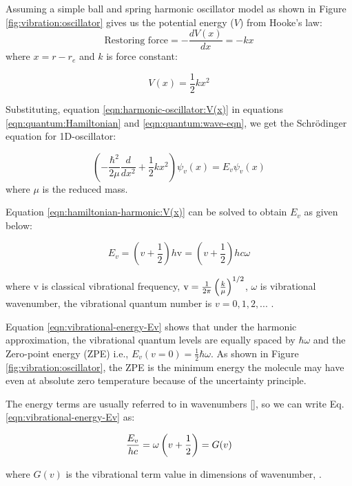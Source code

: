 Assuming a simple ball and spring harmonic oscillator model as shown in Figure \ref{fig:vibration:oscillator} gives us the potential energy ($V$) from Hooke's law:
\[\text{Restoring force} = - \frac{dV(x)}{dx} = -kx\]
where $x=r-r_e$ and $k$ is force constant:

\begin{equation}
    \label{eqn:harmonic-oscillator:V(x)}
    V(x) = \frac{1}{2} k x^2
\end{equation}

Substituting, equation \ref{eqn:harmonic-oscillator:V(x)} in equations \ref{eqn:quantum:Hamiltonian} and \ref{eqn:quantum:wave-eqn}, we get the Schr\"odinger equation for 1D-oscillator:

\begin{equation}
    \label{eqn:hamiltonian-harmonic:V(x)}
    \left( -\frac{\hbar^2}{2\mu} \frac{d}{d x^2} + \frac{1}{2} k x^2 \right ) \psi_v(x) = E_v\psi_v(x)
\end{equation}
where $\mu$ is the reduced mass.

Equation \ref{eqn:hamiltonian-harmonic:V(x)} can be solved to obtain $E_v$ as given below:

\begin{equation}
    \label{eqn:vibrational-energy-Ev}
    E_v = \left( v + \frac{1}{2} \right) h \text{v} = \left( v + \frac{1}{2} \right) hc\omega
\end{equation}

where v is classical vibrational frequency, $\text{v}=\frac{1}{2\pi}\left( \frac{k}{\mu} \right)^{1/2}$, $\omega$ is vibrational wavenumber, the vibrational quantum number is $v=0, 1, 2, ...$ .


Equation \ref{eqn:vibrational-energy-Ev} shows that under the harmonic approximation, the vibrational quantum levels are equally spaced by $\hbar\omega$ and the Zero-point energy (ZPE) i.e., $E_v(v=0)=\frac{1}{2}\hbar\omega$. As shown in Figure \ref{fig:vibration:oscillator}, the ZPE is the minimum energy the molecule may have even at absolute zero temperature because of the uncertainty principle.

The energy terms are usually referred to in wavenumbers [\wn], so we can write Eq. \ref{eqn:vibrational-energy-Ev} as:

\begin{equation}
    \label{eqn:Ev-Gv}
    \frac{E_v}{hc} = \omega \left( v + \frac{1}{2} \right) = G(v)
\end{equation}

where $G(v)$ is the vibrational term value in dimensions of wavenumber, \wn.

